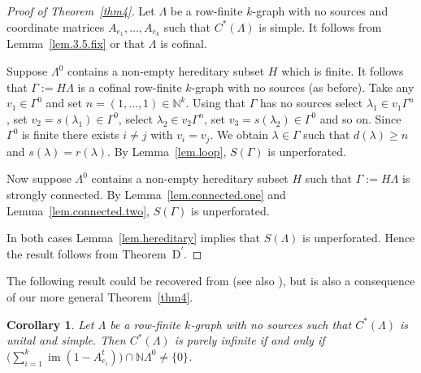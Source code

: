 \documentclass[a4paper, 12pt]{amsart}
\numberwithin{equation}{section}
\newcounter{theorem}
\newtheorem{cor}[theorem]{Corollary}
\theoremstyle{remark}
\theoremstyle{definition}
\begin{document}
\begin{proof}[Proof of Theorem~\ref{thm4}]
Let $\Lambda$ be a row-finite $k$-graph with no sources and coordinate matrices $A_{e_1},
\dots, A_{e_k}$ such that $C^*(\Lambda)$ is simple. It follows from Lemma~\ref{lem.3.5.fix}
or \cite[Theorem~3.1]{MR2323468} that $\Lambda$ is cofinal.

Suppose $\Lambda^0$ contains a non-empty hereditary subset $H$ which is finite. It
follows that $\Gamma:= H\Lambda$ is a cofinal row-finite $k$-graph with no sources (as
before). Take any $v_1\in \Gamma^0$ and set $n=(1,\dots,1)\in {\mathbb{N}}^k$. Using that $\Gamma$ has
no sources select $\lambda_1\in v_1\Gamma^n$, set $v_2=s(\lambda_1)\in \Gamma^0$,  select
$\lambda_2\in v_2\Gamma^n$,  set $v_3=s(\lambda_2)\in \Gamma^0$ and so on. Since
$\Gamma^0$ is finite there exists $i\neq j$ with $v_i=v_j$. We obtain $\lambda\in \Gamma$
such that $d(\lambda)\geq n$ and $s(\lambda)=r(\lambda)$. By Lemma~\ref{lem.loop},
$S(\Gamma)$ is unperforated.

Now suppose $\Lambda^0$ contains a non-empty hereditary subset $H$ such that
$\Gamma:=H\Lambda$ is strongly connected. By Lemma~\ref{lem.connected.one} and
Lemma~\ref{lem.connected.two}, $S(\Gamma)$  is unperforated.

In both cases Lemma~\ref{lem.hereditary}
implies that $S(\Lambda)$ is unperforated. Hence the result follows from
Theorem~D\textsuperscript{$\prime$}.
\end{proof}

The following result could be recovered from \cite{MR2920846} (see also
\cite[Proposition~8.8]{MR2270926}), but is also a consequence of our more general
Theorem~\ref{thm4}.

\begin{cor}\label{cor.unital.case}
Let $\Lambda$ be a row-finite $k$-graph with no sources such that $C^*(\Lambda)$ is
unital and simple. Then $C^*(\Lambda)$ is purely infinite if and only if $\big(\sum_{i=1}^k{\operatorname{im}}(1-A^t_{e_i}) \big) \cap {\mathbb{N}}\Lambda^0\neq \{0\}$.
\end{cor}
\end{document}
